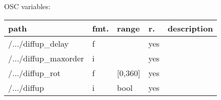 \begin{snugshade}
{\footnotesize
\label{osctab:receivermodhoa2d}
OSC variables:
\nopagebreak

\begin{tabularx}{\textwidth}{llllX}
\hline
path & fmt. & range & r. & description\\
\hline
/.../diffup\_delay & f &  & yes & \\
/.../diffup\_maxorder & i &  & yes & \\
/.../diffup\_rot & f & [0,360] & yes & \\
/.../diffup & i & bool & yes & \\
\hline
\end{tabularx}
}
\end{snugshade}
